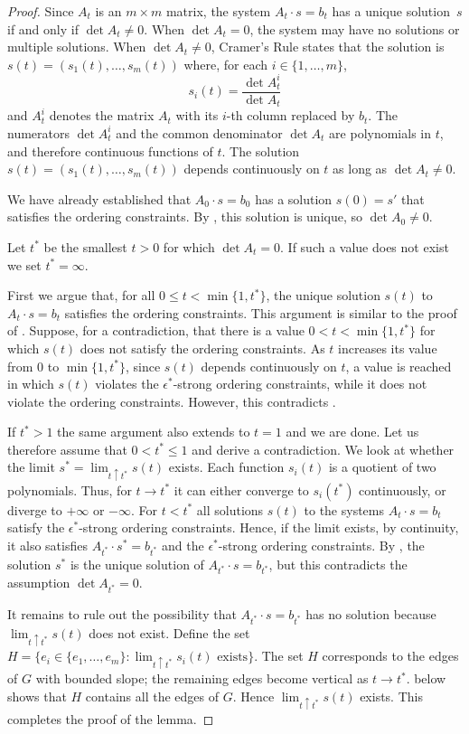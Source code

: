\begin{proof}
	Since $A_t$ is an $m\times m$ matrix, the system $A_t\cdot
	s=b_t$ has a unique solution~$s$ if and only if $\det A_t \neq 0$.
	When $\det A_t =0$, the system may have no solutions or
	multiple solutions.  
	When $\det A_t\neq 0$, 
	Cramer's Rule states that
	the solution
	is $s(t)=(s_1(t),\ldots,s_m(t))$ where, for each
	$i\in\{1,\ldots,m\}$,
	\[ 
	s_i(t) = \frac{\det A_t^i}{\det A_t }
	\]
	and $A_t^i$ denotes the matrix $A_t$ with its $i$-th column replaced
	by $b_t$. 
	The numerators $\det A_t^i$ and the common
	denominator $\det A_t $ are polynomials in $t$, and therefore
	continuous
	functions of $t$.
	The solution $s(t)=(s_1(t),\ldots,s_m(t))$ depends continuously on $t$
	as long as  $\det A_t\ne0 $.
	
	We have already established that $A_0\cdot s=b_0$ has a solution $s(0)=s'$
	that satisfies the ordering constraints. By , this solution
	is unique, so $\det A_0\neq 0$.
	
	Let $t^*$ be the smallest $t>0$
	for which 
	$\det A_{t}= 0$. If such a value does not exist we set $t^*=\infty$.
	
	First we argue that, for all $0\le t <\min \{1,t^*\}$, the unique solution $s(t)$ to $A_t\cdot s=b_t$ satisfies the ordering constraints. This argument is similar to the proof of . Suppose, for a contradiction, that there is a value $0<t<\min\{1,t^*\}$ for which $s(t)$ does not satisfy the ordering constraints. As $t$ increases its value from $0$ to $\min\{1,t^*\}$, since $s(t)$ depends continuously on $t$, a value is reached in which $s(t)$ violates the $\epsilon^*$-strong ordering constraints, while it does not violate the ordering constraints. However, this contradicts	.
	
	If $t^*>1$ the same argument also extends to $t=1$ and we are done.
	Let us therefore assume that $0<t^*\le 1$ and derive a contradiction.
	We look at whether the limit $s^*=\lim_{t\uparrow t^*}
	s(t)$ exists.
	Each function $s_i(t)$ is a quotient of two polynomials.
	Thus, for $t\to t^*$ it can either converge to $s_i(t^*)$ continuously, or diverge to $+\infty$ or $-\infty$.
	For $t<t^*$ all solutions $s(t)$ to the systems $A_t\cdot s=b_t$ satisfy the $\epsilon^*$-strong ordering constraints.
	Hence, if the limit exists, by continuity, it also satisfies $A_{t^*}\cdot s^*=b_{t^*}$
	and the $\epsilon^*$-strong ordering constraints.
	By , the solution $s^*$ is
	the unique solution
	of $A_{t^*}\cdot s=b_{t^*}$, but this contradicts the assumption
	$\det A_{t^*}= 0$.
	
	It remains to rule out the possibility that
	$A_{t^*}\cdot s=b_{t^*}$ has no solution because
	$\lim_{t\uparrow t^*} s(t)$ does not exist.  Define the set $H=\{e_i\in
	\{e_1,\ldots,e_m\}:\text{$\lim_{t\uparrow t^*} s_i(t)$ exists}\}$.
	The set $H$ corresponds to the edges of $G$
	with bounded slope; the remaining edges become vertical as $t\to t^*$.
	 below shows that $H$ contains all the edges of $G$. Hence $\lim_{t\uparrow t^*} s(t)$ exists. This completes the proof of the lemma.
\end{proof}

